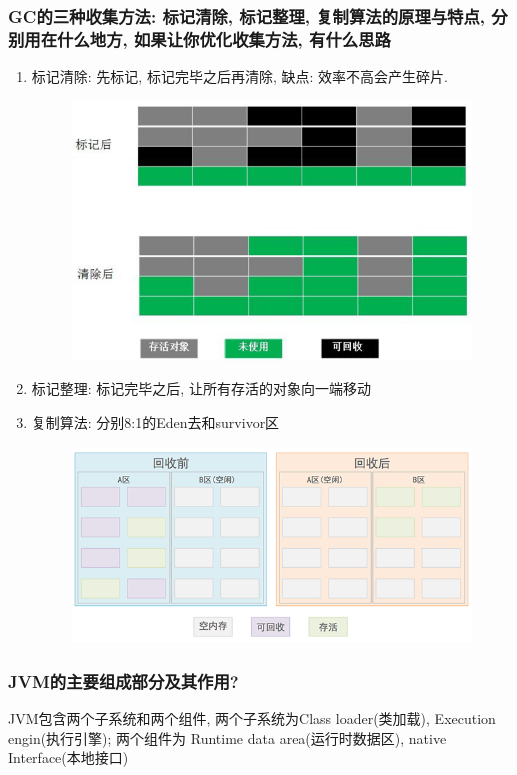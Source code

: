 \documentclass[UTF8]{ctexart}
\begin{document}
\subsubsection{GC的三种收集方法: 标记清除, 标记整理, 复制算法的原理与特点, 分别用在什么地方, 如果让你优化收集方法, 有什么思路}
\begin{enumerate}
	\item 标记清除: 先标记, 标记完毕之后再清除, 缺点: 效率不高会产生碎片.
	\begin{figure}
		\centering
		\includegraphics[width=0.7\linewidth]{figures/sign_remove.png}
		\caption{}
		\label{fig:sign_remove}
	\end{figure}
	\item 标记整理: 标记完毕之后, 让所有存活的对象向一端移动
	\item 复制算法: 分别8:1的Eden去和survivor区
	\begin{figure}
		\centering
		\includegraphics[width=0.7\linewidth]{figures/jvm_copy.jpg}
		\caption{}
		\label{fig:jvm_copy}
	\end{figure}
\end{enumerate}
\subsubsection{JVM的主要组成部分及其作用?}
JVM包含两个子系统和两个组件, 两个子系统为Class loader(类加载), Execution engin(执行引擎); 两个组件为 Runtime data area(运行时数据区), native Interface(本地接口)
\end{document}
